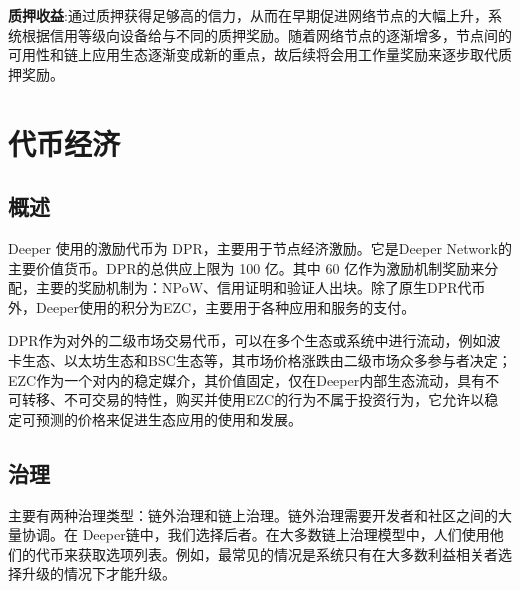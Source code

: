 \documentclass[a4paper]{article}
\begin{document}
\textbf{质押收益}:通过质押获得足够高的信力，从而在早期促进网络节点的大幅上升，系统根据信用等级向设备给与不同的质押奖励。随着网络节点的逐渐增多，节点间的可用性和链上应用生态逐渐变成新的重点，故后续将会用工作量奖励来逐步取代质押奖励。

\newpage
\section{代币经济}
\subsection{概述}
Deeper 使用的激励代币为 DPR，主要用于节点经济激励。它是Deeper Network的主要价值货币。DPR的总供应上限为 100 亿。其中 60 亿作为激励机制奖励来分配，主要的奖励机制为：NPoW、信用证明和验证人出块。除了原生DPR代币外，Deeper使用的积分为EZC，主要用于各种应用和服务的支付。

DPR作为对外的二级市场交易代币，可以在多个生态或系统中进行流动，例如波卡生态、以太坊生态和BSC生态等，其市场价格涨跌由二级市场众多参与者决定；EZC作为一个对内的稳定媒介，其价值固定，仅在Deeper内部生态流动，具有不可转移、不可交易的特性，购买并使用EZC的行为不属于投资行为，它允许以稳定可预测的价格来促进生态应用的使用和发展。






\subsection{治理}
主要有两种治理类型：链外治理和链上治理。链外治理需要开发者和社区之间的大量协调。在 Deeper链中，我们选择后者。在大多数链上治理模型中，人们使用他们的代币来获取选项列表。例如，最常见的情况是系统只有在大多数利益相关者选择升级的情况下才能升级。
\end{document}
